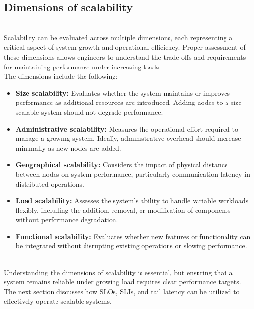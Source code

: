 \subsection{Dimensions of scalability}\label{If-ULI9pfPdCNootNIhTp}
\\
Scalability can be evaluated across multiple dimensions, each representing a critical aspect of system growth and operational efficiency. Proper assessment of these dimensions allows engineers to understand the trade-offs and requirements for maintaining performance under increasing loads.
\\
The dimensions include the following:

\begin{itemize}
\item
\protect{}\label{K_N_0dKlj8qg_bMbj6nRE}
\textbf{Size scalability:} Evaluates whether the system maintains or improves performance as additional resources are introduced. Adding nodes to a size-scalable system should not degrade performance.
\item
\protect{}\label{PuovLtZ-DyPYZ1sdD_VpW}
\textbf{Administrative scalability:} Measures the operational effort required to manage a growing system. Ideally, administrative overhead should increase minimally as new nodes are added.
\item
\protect{}\label{jMob100VoMLi7Nl5XaHnM}
\textbf{Geographical scalability:} Considers the impact of physical distance between nodes on system performance, particularly communication latency in distributed operations.
\item
\protect{}\label{DBB9qLSHZxkEcZpZoU3Bf}
\textbf{Load scalability:} Assesses the system's ability to handle variable workloads flexibly, including the addition, removal, or modification of components without performance degradation.
\item
\protect{}\label{jliOqnuMwTUAvsBr18_4f}
\textbf{Functional scalability:} Evaluates whether new features or functionality can be integrated without disrupting existing operations or slowing performance.
\end{itemize}
\\
Understanding the dimensions of scalability is essential, but ensuring that a system remains reliable under growing load requires clear performance targets. The next section discusses how SLOs, SLIs, and tail latency can be utilized to effectively operate scalable systems.

